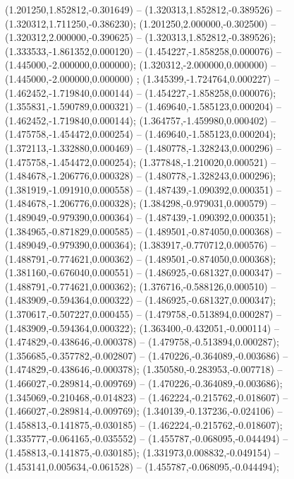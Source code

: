  (1.201250,1.852812,-0.301649) -- (1.320313,1.852812,-0.389526) -- (1.320312,1.711250,-0.386230);
 (1.201250,2.000000,-0.302500) -- (1.320312,2.000000,-0.390625) -- (1.320313,1.852812,-0.389526);
 (1.333533,-1.861352,0.000120) -- (1.454227,-1.858258,0.000076) -- (1.445000,-2.000000,0.000000);
 (1.320312,-2.000000,0.000000) -- (1.445000,-2.000000,0.000000) ;
 (1.345399,-1.724764,0.000227) -- (1.462452,-1.719840,0.000144) -- (1.454227,-1.858258,0.000076);
 (1.355831,-1.590789,0.000321) -- (1.469640,-1.585123,0.000204) -- (1.462452,-1.719840,0.000144);
 (1.364757,-1.459980,0.000402) -- (1.475758,-1.454472,0.000254) -- (1.469640,-1.585123,0.000204);
 (1.372113,-1.332880,0.000469) -- (1.480778,-1.328243,0.000296) -- (1.475758,-1.454472,0.000254);
 (1.377848,-1.210020,0.000521) -- (1.484678,-1.206776,0.000328) -- (1.480778,-1.328243,0.000296);
 (1.381919,-1.091910,0.000558) -- (1.487439,-1.090392,0.000351) -- (1.484678,-1.206776,0.000328);
 (1.384298,-0.979031,0.000579) -- (1.489049,-0.979390,0.000364) -- (1.487439,-1.090392,0.000351);
 (1.384965,-0.871829,0.000585) -- (1.489501,-0.874050,0.000368) -- (1.489049,-0.979390,0.000364);
 (1.383917,-0.770712,0.000576) -- (1.488791,-0.774621,0.000362) -- (1.489501,-0.874050,0.000368);
 (1.381160,-0.676040,0.000551) -- (1.486925,-0.681327,0.000347) -- (1.488791,-0.774621,0.000362);
 (1.376716,-0.588126,0.000510) -- (1.483909,-0.594364,0.000322) -- (1.486925,-0.681327,0.000347);
 (1.370617,-0.507227,0.000455) -- (1.479758,-0.513894,0.000287) -- (1.483909,-0.594364,0.000322);
 (1.363400,-0.432051,-0.000114) -- (1.474829,-0.438646,-0.000378) -- (1.479758,-0.513894,0.000287);
 (1.356685,-0.357782,-0.002807) -- (1.470226,-0.364089,-0.003686) -- (1.474829,-0.438646,-0.000378);
 (1.350580,-0.283953,-0.007718) -- (1.466027,-0.289814,-0.009769) -- (1.470226,-0.364089,-0.003686);
 (1.345069,-0.210468,-0.014823) -- (1.462224,-0.215762,-0.018607) -- (1.466027,-0.289814,-0.009769);
 (1.340139,-0.137236,-0.024106) -- (1.458813,-0.141875,-0.030185) -- (1.462224,-0.215762,-0.018607);
 (1.335777,-0.064165,-0.035552) -- (1.455787,-0.068095,-0.044494) -- (1.458813,-0.141875,-0.030185);
 (1.331973,0.008832,-0.049154) -- (1.453141,0.005634,-0.061528) -- (1.455787,-0.068095,-0.044494);
